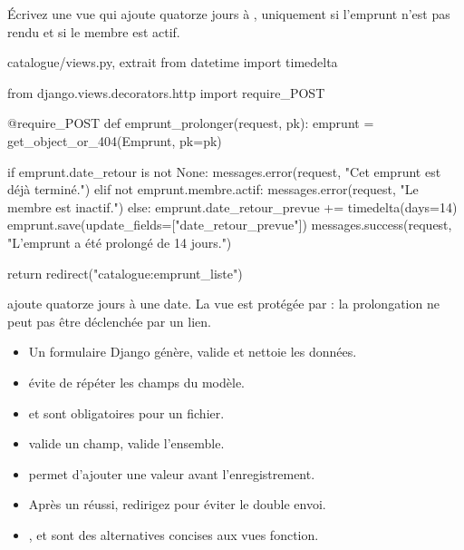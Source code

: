\begin{exercice}
Écrivez une vue  qui ajoute quatorze jours à
, uniquement si l'emprunt n'est pas rendu et si le
membre est actif.
\end{exercice}

\begin{correction}
\begin{codebox}[python]{catalogue/views.py, extrait}
from datetime import timedelta

from django.views.decorators.http import require_POST


@require_POST
def emprunt_prolonger(request, pk):
    emprunt = get_object_or_404(Emprunt, pk=pk)

    if emprunt.date_retour is not None:
        messages.error(request, "Cet emprunt est déjà terminé.")
    elif not emprunt.membre.actif:
        messages.error(request, "Le membre est inactif.")
    else:
        emprunt.date_retour_prevue += timedelta(days=14)
        emprunt.save(update_fields=["date_retour_prevue"])
        messages.success(request, "L'emprunt a été prolongé de 14 jours.")

    return redirect("catalogue:emprunt_liste")
\end{codebox}

 ajoute quatorze jours à une date. La vue est protégée
par  : la prolongation ne peut pas être déclenchée par un lien.
\end{correction}

\begin{retenir}
\begin{itemize}
  \item Un formulaire Django génère, valide et nettoie les données.
  \item {} évite de répéter les champs du modèle.
  \item {} et  sont obligatoires pour un fichier.
  \item {} valide un champ,  valide l'ensemble.
  \item {} permet d'ajouter une valeur avant l'enregistrement.
  \item Après un  réussi, redirigez pour éviter le double envoi.
  \item {},  et  sont des
        alternatives concises aux vues fonction.
\end{itemize}
\end{retenir}
